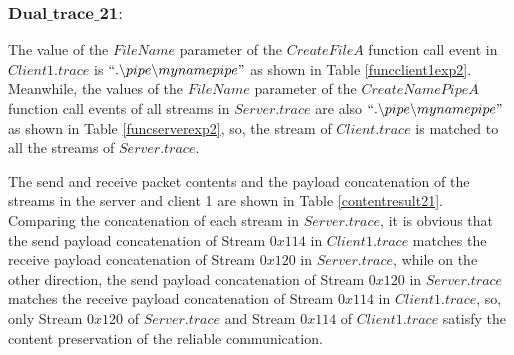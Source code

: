 \subsubsection{$\boldsymbol{Dual\_trace\_21:}$}
The value of the $FileName$ parameter of the $CreateFileA$ function call event in $Client1.trace$ is $``.\backslash pipe \backslash mynamepipe"$ as shown in Table \ref{funcclient1exp2}. Meanwhile, the values of the $FileName$ parameter of the $CreateNamePipeA$ function call events of all streams in $Server.trace$ are also $``.\backslash pipe \backslash mynamepipe"$ as shown in Table \ref{funcserverexp2}, so, the stream of $Client.trace$ is matched to all the streams of $Server.trace$.

The send and receive packet contents and the payload concatenation of the streams in the server and client 1 are shown in Table \ref{contentresult21}. Comparing the concatenation of each stream in $Server.trace$, it is obvious that the send payload concatenation of Stream $0x114$ in $Client1.trace$ matches the receive payload concatenation of Stream $0x120$ in $Server.trace$, while on the other direction, the send payload concatenation of Stream $0x120$ in $Server.trace$ matches the receive payload concatenation of Stream $0x114$ in $Client1.trace$, so, only Stream $0x120$ of $Server.trace$ and Stream $0x114$ of $Client1.trace$ satisfy the content preservation of the reliable communication. 

